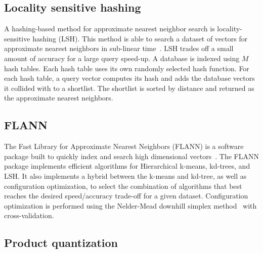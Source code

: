         \subsection{Locality sensitive hashing}
            A hashing-based method for approximate nearest neighbor
              search is locality-sensitive hashing (LSH).
            This method is able to search a dataset of vectors for
              approximate nearest neighbors in sub-linear
              time~\cite{charikar_similarity_2002,
              datar_localitysensitive_2004, kulis_fast_2009,
              kulis_kernelized_2012, tao_locality_2013}.
            LSH trades off a small amount of accuracy for a large query
              speed-up.
            A database is indexed using $M$ hash tables.
            Each hash table uses its own randomly selected hash
              function.
            For each hash table, a query vector computes its hash and
              adds the database vectors it collided with to a shortlist.
            The shortlist is sorted by distance and returned as the
              approximate nearest neighbors.

        \subsection{FLANN}
            The Fast Library for Approximate Nearest Neighbors (FLANN)
              is a software package built to quickly index and search
              high dimensional vectors~\cite{muja_fast_2009}.
            The FLANN package implements efficient algorithms for
              Hierarchical k-means, kd-trees, and LSH{}.
            It also implements a hybrid between the k-means and
              kd-tree, as well as configuration optimization, to select
              the combination of algorithms that best reaches the desired
              speed/accuracy trade-off for a given dataset.
            Configuration optimization is performed using the
              Nelder-Mead downhill simplex
              method~\cite{nelder_simplex_1965} with cross-validation.


        \subsection{Product quantization}
        
